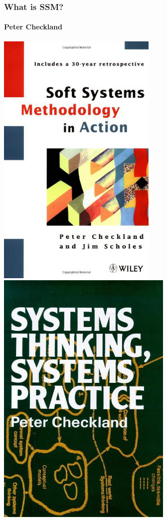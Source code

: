 \documentclass{beamer}
\begin{document}
\begin{frame}
  \frametitle{What is SSM?}
  \framesubtitle{Peter Checkland}
  \begin{center}
    \includegraphics[height=0.8\textheight]{ssma.jpg}
    \quad
    \includegraphics[height=0.8\textheight]{stsp.jpg}
  \end{center}
\end{frame}
\end{document}
